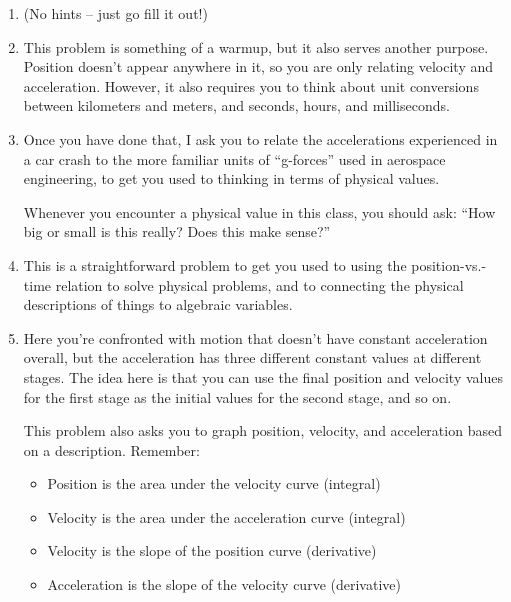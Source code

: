 \documentclass[12pt]{article}
\begin{document}
\Large
\centerline{}
\normalsize

\begin{enumerate}

\item {(No hints -- just go fill it out!)}

\item{This problem is something of a warmup, but it also serves another purpose. Position doesn't appear anywhere in it, so you are only
relating velocity and acceleration. However, it also requires you to think about unit conversions between kilometers and meters, and 
seconds, hours, and milliseconds. }

\item Once you have done that, I ask you to relate the accelerations experienced in a car crash to the 
more familiar units of ``g-forces'' used in aerospace engineering, to get you used to thinking in terms of physical values. 

Whenever you encounter a physical value in this class, you should ask: ``How big or small is this really? Does this make sense?''


\item{This is a straightforward problem to get you used to using the position-vs.-time relation to solve physical problems, and to 
connecting the physical descriptions of things to algebraic variables.}


\item{Here you're confronted with motion that doesn't have constant acceleration overall, but the acceleration has three different
constant values at different stages. The idea here is that you can use the final position and velocity values for the first stage as the
initial values for the second stage, and so on.

This problem also asks you to graph position, velocity, and acceleration based on a description. Remember:

\begin{itemize}

\item{Position is the area under the velocity curve (integral)}
\item{Velocity is the area under the acceleration curve (integral)}

\medskip

\item{Velocity is the slope of the position curve (derivative)}
\item{Acceleration is the slope of the velocity curve (derivative)}


\end{itemize}}
\end{enumerate}
\end{document}
